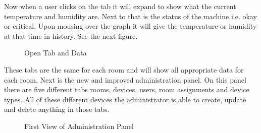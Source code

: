 \documentclass{report}
\begin{document}
\indent
Now when a user clicks on the tab it will expand to show what the current temperature and humidity are. Next to that is the status of the machine i.e. okay or critical. Upon mousing over the graph it will give the temperature or humidity at that time in history. See the next figure.
\begin{figure}[H]
	\caption{Open Tab and Data}
\end{figure}
\newpage

\indent
These tabs are the same for each room and will show all appropriate data for each room. Next is the new and improved administration panel. On this panel there are five different tabs rooms, devices, users, room assignments and device types. All of these different devices the administrator is able to create, update and delete anything in those tabs. 
\begin{figure}[H]
	\caption{First View of Administration Panel}
\end{figure}
\newpage
\end{document}
